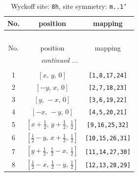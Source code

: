\documentclass[fleqn,8pt]{jsarticle}
\begin{document}
\begin{longtable}{ccc}
\caption{Wyckoff site: {\tt 8h}, site symmetry: {\tt m..1'}}
 \\
 \hline \hline
No. & position & mapping \\ \hline \endfirsthead

\multicolumn{2}{l}{\tablename\ \thetable{}} \\
 \hline \hline
No. & position & mapping \\ \hline \endhead

 \hline \hline
\multicolumn{2}{r}{\footnotesize\it continued ...} \\ \endfoot

 \hline \hline
\multicolumn{2}{r}{} \\ \endlastfoot

1 & $\left[ x,\, y,\, 0 \right]$ & {\tt [1,8,17,24]} \\ \hline
2 & $\left[ - y,\, x,\, 0 \right]$ & {\tt [2,7,18,23]} \\ \hline
3 & $\left[ y,\, - x,\, 0 \right]$ & {\tt [3,6,19,22]} \\ \hline
4 & $\left[ - x,\, - y,\, 0 \right]$ & {\tt [4,5,20,21]} \\ \hline
5 & $\left[ x + \frac{1}{2},\, y + \frac{1}{2},\, \frac{1}{2} \right]$ & {\tt [9,16,25,32]} \\ \hline
6 & $\left[ \frac{1}{2} - y,\, x + \frac{1}{2},\, \frac{1}{2} \right]$ & {\tt [10,15,26,31]} \\ \hline
7 & $\left[ y + \frac{1}{2},\, \frac{1}{2} - x,\, \frac{1}{2} \right]$ & {\tt [11,14,27,30]} \\ \hline
8 & $\left[ \frac{1}{2} - x,\, \frac{1}{2} - y,\, \frac{1}{2} \right]$ & {\tt [12,13,28,29]} \\
\end{longtable}
\renewcommand{\arraystretch}{1.2}
\end{document}
